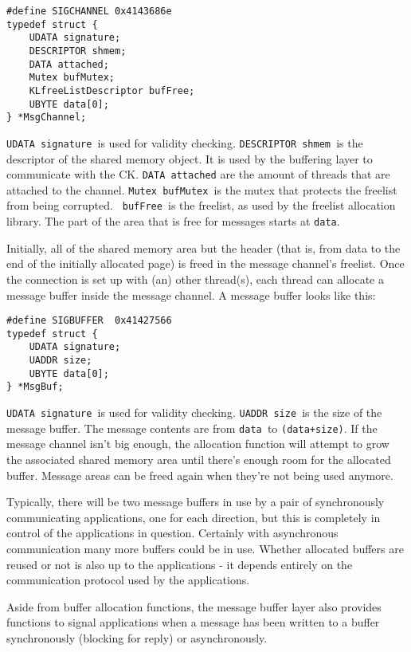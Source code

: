 \documentclass[]{article}
\begin{document}
\begin{verbatim}
#define SIGCHANNEL 0x4143686e
typedef struct {
    UDATA signature;
    DESCRIPTOR shmem;
    DATA attached;
    Mutex bufMutex;
    KLfreeListDescriptor bufFree;
    UBYTE data[0];
} *MsgChannel;
\end{verbatim}

{\tt UDATA signature }is used for validity checking. {\tt DESCRIPTOR shmem
}is the descriptor of the shared memory object.  It is used by the
buffering layer to communicate with the CK. {\tt DATA attached} are the
amount of threads that are attached to the channel. {\tt Mutex bufMutex
}is the mutex that protects the freelist from being corrupted. {\tt
bufFree }is the freelist, as used by the freelist allocation library. The
part of the area that is free for messages starts at {\tt data}.

Initially, all of the shared memory area but the header (that is, from
data to the end of the initially allocated page) is freed in the message
channel's freelist.  Once the connection is set up with (an) other
thread(s), each thread can allocate a message buffer inside the message
channel. A message buffer looks like this:

\begin{verbatim}
#define SIGBUFFER  0x41427566
typedef struct {
    UDATA signature;
    UADDR size;
    UBYTE data[0];
} *MsgBuf;
\end{verbatim}

{\tt UDATA signature }is used for validity checking.  {\tt UADDR size }is
the size of the message buffer. The message contents are from {\tt data
}to {\tt (data+size)}.  If the message channel isn't big enough, the
allocation function will attempt to grow the associated shared memory area
until there's enough room for the allocated buffer.  Message areas can be
freed again when they're not being used anymore.

Typically, there will be two message buffers in use by a pair of
synchronously communicating applications, one for each direction, but this
is completely in control of the applications in question.  Certainly with
asynchronous communication many more buffers could be in use. Whether
allocated buffers are reused or not is also up to the applications - it
depends entirely on the communication protocol used by the applications.

Aside from buffer allocation functions, the message buffer layer also
provides functions to signal applications when a message has been written
to a buffer synchronously (blocking for reply) or asynchronously.
\end{document}
